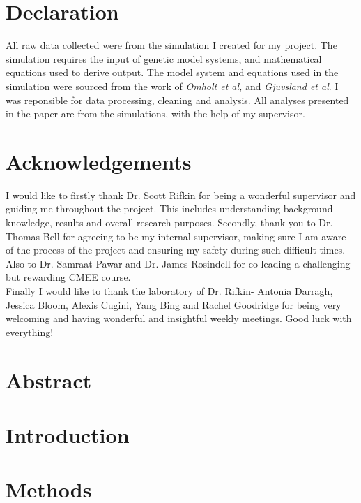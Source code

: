 \documentclass[11pt]{article}
\begin{document}


\newpage

\section{Declaration}
All raw data collected were from the simulation I created for my project. The simulation requires the input of genetic model systems, and mathematical equations used to derive output. The model system and equations used in the simulation were sourced from the work of \textit{Omholt et al,} and \textit{Gjuvsland et al}. I was reponsible for data processing, cleaning and analysis. All analyses presented in the paper are from the simulations, with the help of my supervisor.

\section{Acknowledgements}
I would like to firstly thank Dr. Scott Rifkin for being a wonderful supervisor and guiding me throughout the project. This includes understanding background knowledge, results and overall research purposes. Secondly, thank you to Dr. Thomas Bell for agreeing to be my internal supervisor, making sure I am aware of the process of the project and ensuring my safety during such difficult times. Also to Dr. Samraat Pawar and Dr. James Rosindell for co-leading a challenging but rewarding CMEE course.
\\Finally I would like to thank the laboratory of Dr. Rifkin- Antonia Darragh, Jessica Bloom, Alexis Cugini, Yang Bing and Rachel Goodridge for being very welcoming and having wonderful and insightful weekly meetings. Good luck with everything!

\newpage

\section{Abstract}

\newpage

\section{Introduction}


\section{Methods}

\end{document}

